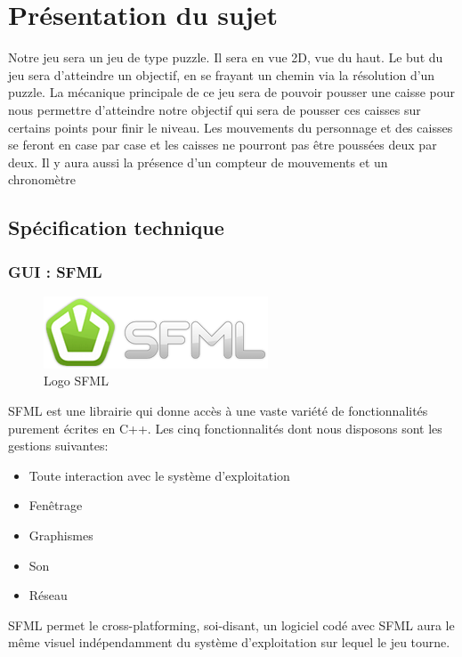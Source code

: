 \section{Présentation du sujet}
Notre jeu sera un jeu de type puzzle. Il sera en vue 2D, vue du haut. Le but du jeu sera d’atteindre un objectif, en se frayant un chemin via la résolution d’un puzzle. 
La mécanique principale de ce jeu sera de pouvoir pousser une caisse pour nous permettre d’atteindre notre objectif qui sera de pousser ces caisses sur certains points pour finir le niveau. 
Les mouvements du personnage et des caisses se feront en case par case et les caisses ne pourront pas être poussées deux par deux. Il y aura aussi la présence d’un compteur de mouvements et  un 
chronomètre

\subsection{Spécification technique}
\subsubsection{GUI : SFML}
\begin{figure}[h]
	\centering
	\includegraphics{pictures/SFML_logo.png}
	\caption{Logo SFML}
	\label{fig:logo_sfml}
\end{figure}
SFML est une librairie qui donne accès à une vaste variété de fonctionnalités purement écrites en C++. Les cinq fonctionnalités dont nous disposons sont les gestions suivantes:
\begin{itemize}
	\item Toute interaction avec le système d'exploitation
	\item Fenêtrage
	\item Graphismes
	\item Son
	\item Réseau
\end{itemize}

SFML permet le cross-platforming, soi-disant, un logiciel codé avec SFML aura le même visuel indépendamment du système d'exploitation sur lequel le jeu tourne.

